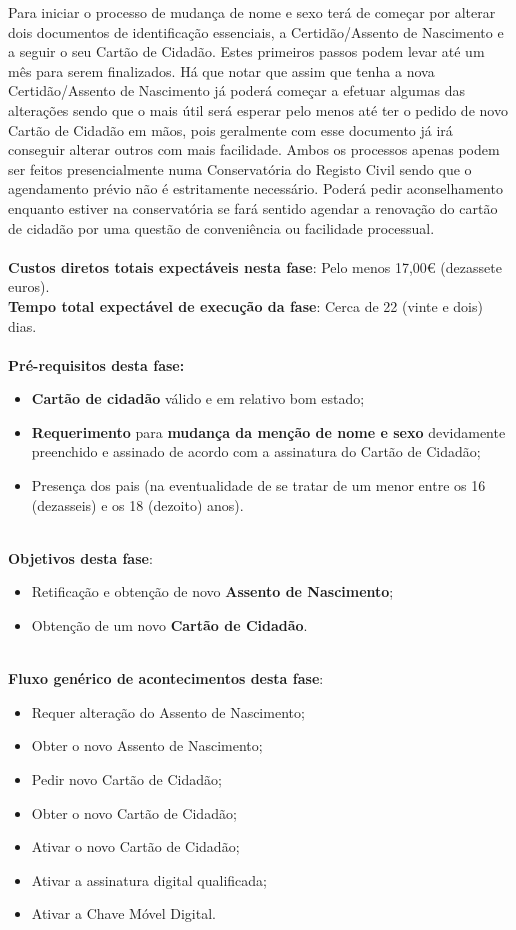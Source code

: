Para iniciar o processo de mudança de nome e sexo terá de começar por
alterar dois documentos de identificação essenciais, a Certidão/Assento
de Nascimento e a seguir o seu Cartão de Cidadão. Estes primeiros passos
podem levar até um mês para serem finalizados. Há que notar que assim
que tenha a nova Certidão/Assento de Nascimento já poderá começar a
efetuar algumas das alterações sendo que o mais útil será esperar pelo
menos até ter o pedido de novo Cartão de Cidadão em mãos, pois
geralmente com esse documento já irá conseguir alterar outros com mais
facilidade. Ambos os processos apenas podem ser feitos presencialmente
numa Conservatória do Registo Civil sendo que o agendamento prévio não é
estritamente necessário. Poderá pedir aconselhamento enquanto estiver na
conservatória se fará sentido agendar a renovação do cartão de cidadão
por uma questão de conveniência ou facilidade processual. \\
\\
\textbf{Custos diretos totais expectáveis nesta fase}: Pelo menos 17,00€ (dezassete euros). \\
\textbf{Tempo total expectável de execução da fase}: Cerca de 22 (vinte e dois) dias. \\
\\
\textbf{Pré-requisitos desta fase:}
\begin{itemize}
	\item \textbf{Cartão de cidadão} válido e em relativo bom estado;
	\item \textbf{Requerimento} para \textbf{mudança da menção de nome e sexo} devidamente preenchido e assinado de acordo com a assinatura do Cartão de Cidadão;
	\item Presença dos pais (na eventualidade de se tratar de um menor entre os 16 (dezasseis) e os 18 (dezoito) anos).
\end{itemize}
\leavevmode\\
\textbf{Objetivos desta fase}:
\begin{itemize}
	\item Retificação e obtenção de novo \textbf{Assento de Nascimento};
	\item Obtenção de um novo \textbf{Cartão de Cidadão}.
\end{itemize}
\leavevmode\\
\textbf{Fluxo genérico de acontecimentos desta fase}:
\begin{itemize}
	\item Requer alteração do Assento de Nascimento;
	\item Obter o novo Assento de Nascimento;
	\item Pedir novo Cartão de Cidadão;
	\item Obter o novo Cartão de Cidadão;
	\item Ativar o novo Cartão de Cidadão;
	\item Ativar a assinatura digital qualificada;
	\item Ativar a Chave Móvel Digital.
\end{itemize}

